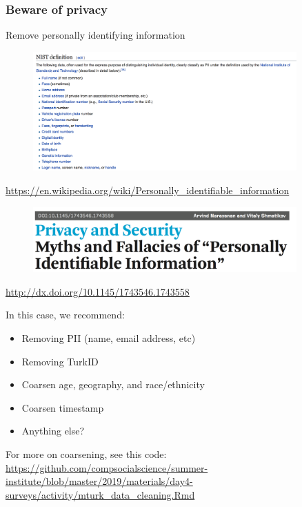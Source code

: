 \documentclass[aspectratio=169]{beamer}
\begin{document}
\begin{frame}
\frametitle{Beware of privacy}
\pause

Remove personally identifying information 

\begin{figure}
  \centering
  \includegraphics[width=0.9\textwidth]{figures/pii_nist}
\end{figure}

\vfill
\url{https://en.wikipedia.org/wiki/Personally_identifiable_information}

\end{frame}
\begin{frame}

\begin{figure}
  \centering
  \includegraphics[width=0.9\textwidth]{figures/narayanan_myths_2010_title}
\end{figure}

\vfill
\url{http://dx.doi.org/10.1145/1743546.1743558}
\end{frame}
\begin{frame}

In this case, we recommend:
\begin{itemize}
\item Removing PII (name, email address, etc)
\item Removing TurkID
\item Coarsen age, geography, and race/ethnicity
\item Coarsen timestamp
\item Anything else?
\end{itemize}

For more on coarsening, see this code:\\
\url{https://github.com/compsocialscience/summer-institute/blob/master/2019/materials/day4-surveys/activity/mturk_data_cleaning.Rmd}

\end{frame}
\end{document}
